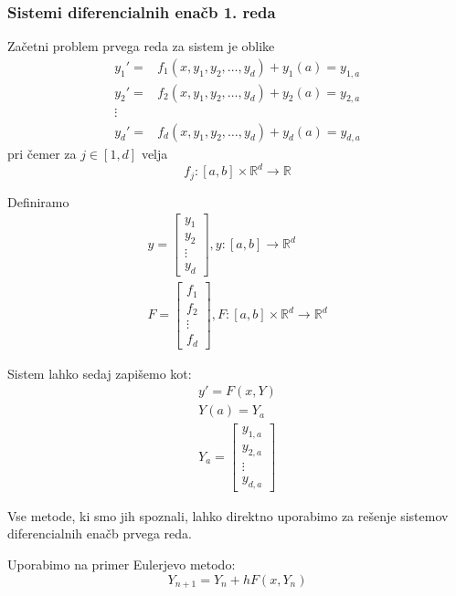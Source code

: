 \documentclass[a4paper,12pt]{article}
\theoremstyle{definition}
\theoremstyle{remark}
\newcommand{\R}{\mathbb{R}}
\begin{document}
\subsubsection{Sistemi diferencialnih enačb 1. reda}
Začetni problem prvega reda za sistem je oblike
\begin{align*}
    y_1' =& f_1(x, y_1, y_2, \dots, y_d) + y_1(a) = y_{1, a} \\
    y_2' =& f_2(x, y_1, y_2, \dots, y_d) + y_2(a) = y_{2, a} \\
    \vdots& \\
    y_d' =& f_d(x, y_1, y_2, \dots, y_d) + y_d(a) = y_{d, a}
\end{align*}
pri čemer za $j \in [1, d]$ velja
\begin{equation*}
    f_j: [a, b] \times \R^d \to \R
\end{equation*}

Definiramo
\begin{gather*}
    y = \begin{bmatrix}
        y_1 \\
        y_2 \\
        \vdots \\
        y_d
    \end{bmatrix}, y: [a, b] \to \R^d \\
    F = \begin{bmatrix}
        f_1 \\
        f_2 \\
        \vdots \\
        f_d
    \end{bmatrix}, 
    F: [a, b]\times \R^d \to \R^d
\end{gather*}

Sistem lahko sedaj zapišemo kot:
\begin{gather*}
    y' = F(x, Y) \\
    Y(a) = Y_a \\
    Y_a = \begin{bmatrix}
        y_{1, a} \\
        y_{2, a} \\
        \vdots \\
        y_{d, a}
    \end{bmatrix}
\end{gather*}

Vse metode, ki smo jih spoznali, lahko direktno uporabimo za rešenje sistemov diferencialnih enačb prvega reda.

Uporabimo na primer Eulerjevo metodo:
\begin{equation*}
    Y_{n+1} = Y_n + h F(x, Y_n)
\end{equation*}
\end{document}

